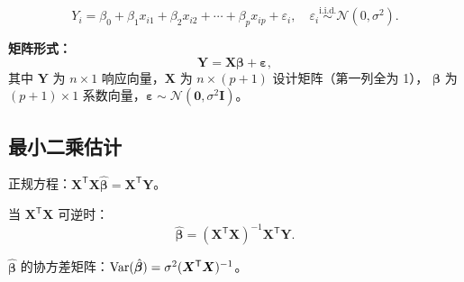\begin{definition}[多元线性回归模型]
\begin{equation}
    Y_i = \beta_0 + \beta_1 x_{i1} + \beta_2 x_{i2} + \cdots + \beta_p x_{ip} + \varepsilon_i,
    \quad \varepsilon_i \stackrel{\mathrm{i.i.d.}}{\sim} \mathcal{N}(0, \sigma^2).
\end{equation}
\end{definition}

\textbf{矩阵形式：}
\begin{equation}
    \bm{Y} = \bm{X}\bm{\beta} + \bm{\varepsilon},
\end{equation}
其中 $\bm{Y}$ 为 $n \times 1$ 响应向量，$\bm{X}$ 为 $n \times (p+1)$ 设计矩阵（第一列全为 1），
$\bm{\beta}$ 为 $(p+1) \times 1$ 系数向量，$\bm{\varepsilon} \sim \mathcal{N}(\bm{0}, \sigma^2 \bm{I})$。

\subsection{最小二乘估计}

正规方程：$\bm{X}^{\mathsf{T}}\bm{X}\hat{\bm{\beta}} = \bm{X}^{\mathsf{T}}\bm{Y}$。

当 $\bm{X}^{\mathsf{T}}\bm{X}$ 可逆时：
\begin{equation}
    \boxed{\hat{\bm{\beta}} = (\bm{X}^{\mathsf{T}}\bm{X})^{-1} \bm{X}^{\mathsf{T}}\bm{Y}}.
\end{equation}

$\hat{\bm{\beta}}$ 的协方差矩阵：$\mathrm{Var}(\hat{\bm{\beta}}) = \sigma^2 (\bm{X}^{\mathsf{T}}\bm{X})^{-1}$。

